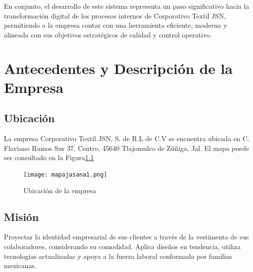 \documentclass[12pt,letterpaper,spanish]{report}
\begin{document}
En conjunto, el desarrollo de este sistema representa un paso significativo hacia la transformación digital de los procesos internos de Corporativo Textil JSN, permitiendo a la empresa contar con una herramienta eficiente, moderna y alineada con sus objetivos estratégicos de calidad y control operativo.






\chapter{Antecedentes y Descripción de la Empresa}
\newpage




\section{Ubicación}
La empresa Corporativo Textil JSN, S. de R.L de C.V se encuentra ubicada en C. Flaviano Ramos Sur 37, Centro, 45640 Tlajomulco de Zúñiga, Jal. El mapa puede ser consultado en la Figura\ref{a01}

\begin{figure}[htp]
  \centering
  \texttt{[image: mapajasana1.png]}
  \caption{Ubicación de la empresa}\label{a01}
\end{figure}




\section{Misión}
Proyectar la identidad empresarial de sus clientes a través de la vestimenta de sus colaboradores, considerando su comodidad. Aplica diseños en tendencia, utiliza tecnologías actualizadas y apoya a la fuerza laboral conformada por familias mexicanas.
\end{document}
